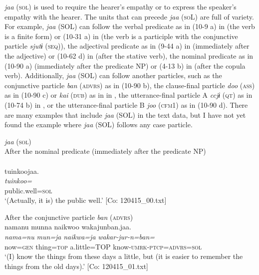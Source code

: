 \textit{jaa} (\textsc{sol}) is used to require the hearer’s empathy or to express the speaker’s empathy with the hearer. The units that can precede \textit{jaa} (\textsc{so}L) are full of variety. For example, \textit{jaa} (SOL) can follow the verbal predicate as in (10-9 a) in  (the verb is a finite form) or (10-31 a) in  (the verb is a participle with the conjunctive particle \textit{sjutɨ} (\textsc{seq})), the adjectival predicate as in (9-44 a) in  (immediately after the adjective) or (10-62 d) in  (after the stative verb), the nominal predicate as in (10-90 a) (immediately after the predicate NP) or (4-13 b) in  (after the copula verb). Additionally, \textit{jaa} (SOL) can follow another particles, such as the conjunctive particle \textit{ban} (\textsc{advrs}) as in (10-90 b), the clause-final particle \textit{doo} (\textsc{ass}) as in (10-90 c) or \textit{kai} (\textsc{dub}) as in  in , the utterance-final particle A \textit{ccjɨ} (\textsc{qt}) as in (10-74 b) in , or the utterance-final particle B \textit{joo} (\textsc{cfm}1) as in (10-90 d). There are many examples that include \textit{jaa} (SOL) in the text data, but I have not yet found the example where \textit{jaa} (SOL) follows any case particle.

\ea\label{ex:10.90}   \textit{jaa} (\textsc{sol})\\
  \ea After the nominal predicate (immediately after the predicate NP)\\\\
      \glll    tuinkoojaa.\\
    \textit{tuinkoo=}\\
    public.well=\textsc{sol}\\
  \glt     ‘(Actually, it is) the public well.’ [Co: 120415\_00.txt]

  \ex After the conjunctive particle \textit{ban} (\textsc{advrs})\\
      \glll    namanu  munna  naikwoo  wakajunban.jaa.\\
    \textit{nama=nu}  \textit{mun=ja}  \textit{naikwa=ja}  \textit{wakar-jur-n=ban=}\\
    now=\textsc{gen}  thing=\textsc{top}  a.little=TOP  know-\textsc{umrk}-\textsc{ptcp}=\textsc{advrs}=\textsc{sol}\\
  \glt     ‘(I) know the things from these days a little, but (it is easier to remember the things from the old days).’ [Co: 120415\_01.txt]

